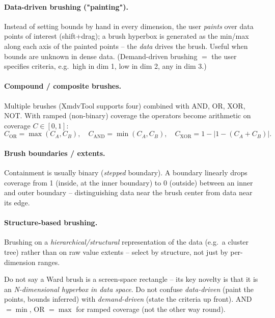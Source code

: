 \paragraph{Data-driven brushing ("painting").} Instead of setting bounds by hand in every dimension, the user \emph{paints} over data points of interest (shift+drag); a brush hyperbox is generated as the min/max along each axis of the painted points -- the \emph{data} drives the brush. Useful when bounds are unknown in dense data. (Demand-driven brushing $=$ the user specifies criteria, e.g.\ high in dim 1, low in dim 2, any in dim 3.)

\paragraph{Compound / composite brushes.} Multiple brushes (XmdvTool supports four) combined with  AND, OR, XOR, NOT. With ramped (non-binary) coverage the operators become arithmetic on coverage $C\in[0,1]$:
\[
  C_{\text{OR}}=\max(C_A,C_B),\quad
  C_{\text{AND}}=\min(C_A,C_B),\quad
  C_{\text{XOR}}=1-\lvert 1-(C_A+C_B)\rvert .
\]

\paragraph{Brush boundaries / extents.} Containment is usually binary (\emph{stepped} boundary). A  boundary linearly drops coverage from 1 (inside, at the inner boundary) to 0 (outside) between an inner and outer boundary -- distinguishing data near the brush center from data near its edge.

\paragraph{Structure-based brushing.} Brushing on a \emph{hierarchical/structural} representation of the data (e.g.\ a cluster tree) rather than on raw value extents -- select by structure, not just by per-dimension ranges.

\begin{pitfall}
Do not say a Ward brush is a screen-space rectangle -- its key novelty is that it is an \emph{N-dimensional hyperbox in data space}. Do not confuse \emph{data-driven} (paint the points, bounds inferred) with \emph{demand-driven} (state the criteria up front). AND $=\min$, OR $=\max$ for ramped coverage (not the other way round).
\end{pitfall}

